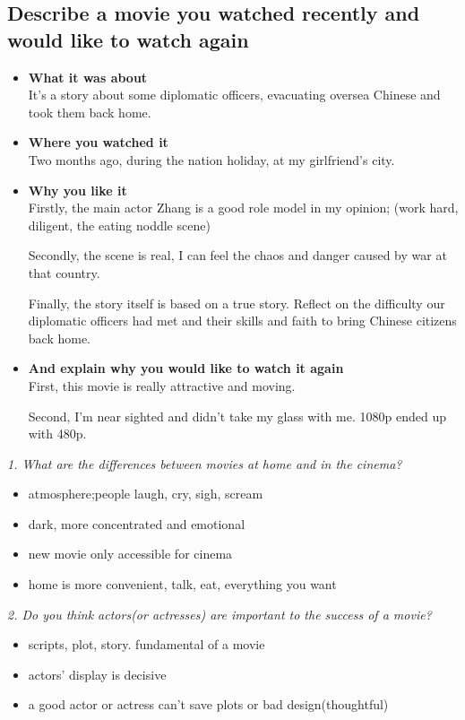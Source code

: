 \documentclass[conference]{IEEEtran}
\begin{document}
\subsection{Describe a movie you watched recently and would like to watch again}
\begin{itemize}
    \item \textbf{What it was about}\\
    It's a story about some diplomatic officers, evacuating oversea Chinese and took them back home.
    \item \textbf{Where you watched it}\\
    Two months ago, during the nation holiday, at my girlfriend's city.
    \item \textbf{Why you like it}\\
    Firstly, the main actor Zhang is a good role model in my opinion; (work hard, diligent, the eating noddle scene)
    
    Secondly, the scene is real, I can feel the chaos and danger caused by war at that country.

    Finally, the story itself is based on a true story. Reflect on the difficulty our diplomatic officers had met and
    their skills and faith to bring Chinese citizens back home.
    \item \textbf{And explain why you would like to watch it again}\\
    First, this movie is really attractive and moving.

    Second, I'm near sighted and didn't take my glass with me. 1080p ended up with 480p.
\end{itemize}

\textit{1. What are the differences between movies at home and in the cinema?}
\begin{itemize}
    \item atmosphere;people laugh, cry, sigh, scream
    \item dark, more concentrated and emotional
    \item new movie only accessible for cinema
    \item home is more convenient, talk, eat, everything you want
\end{itemize}

\textit{2. Do you think actors(or actresses) are important to the success of a movie?}
\begin{itemize}
    \item scripts, plot, story. fundamental of a movie
    \item actors' display is decisive
    \item a good actor or actress can't save plots or bad design(thoughtful)
\end{itemize}
\end{document}
